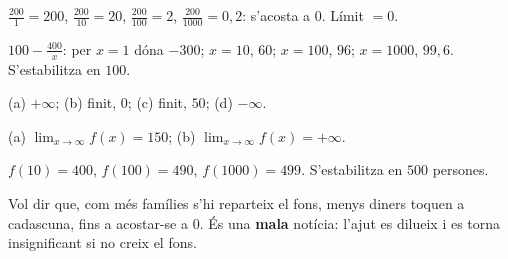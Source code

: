 \begin{solucions}
\begin{sollist}
  \item $\frac{200}{1}=200$, $\frac{200}{10}=20$, $\frac{200}{100}=2$,
        $\frac{200}{1000}=0,2$: s'acosta a $0$. Límit $=0$.
  \item $100-\frac{400}{x}$: per $x=1$ dóna $-300$; $x=10$, $60$; $x=100$, $96$;
        $x=1000$, $99,6$. S'estabilitza en $100$.
  \item (a) $+\infty$; \quad (b) finit, $0$; \quad (c) finit, $50$; \quad (d) $-\infty$.
  \item (a) $\displaystyle\lim_{x\to\infty}f(x)=150$; \quad
        (b) $\displaystyle\lim_{x\to\infty}f(x)=+\infty$.
  \item $f(10)=400$, $f(100)=490$, $f(1000)=499$. S'estabilitza en $500$ persones.
  \item Vol dir que, com més famílies s'hi reparteix el fons, menys diners toquen a
        cadascuna, fins a acostar-se a $0$. És una \textbf{mala} notícia: l'ajut es
        dilueix i es torna insignificant si no creix el fons.
\end{sollist}
\end{solucions}
